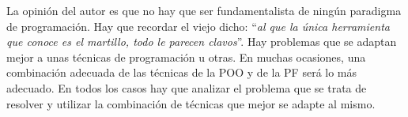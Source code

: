 La opinión del autor es que no hay que ser fundamentalista de ningún paradigma de programación. Hay que recordar el viejo dicho: ``\textit{al que la única herramienta que conoce es el martillo, todo le parecen clavos}''. Hay problemas que se adaptan mejor a unas técnicas de programación u otras. En muchas ocasiones, una combinación adecuada de las técnicas de la POO y de la PF será lo más adecuado. En todos los casos hay que analizar el problema que se trata de resolver y utilizar la combinación de técnicas que mejor se adapte al mismo.

